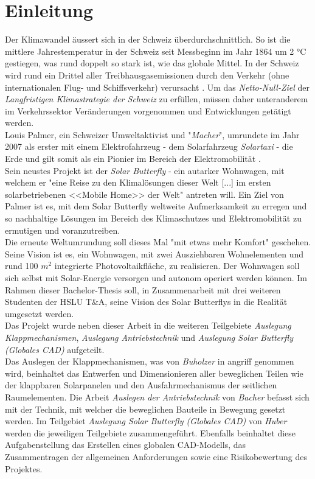 \section{Einleitung}
Der Klimawandel äussert sich in der Schweiz überdurchschnittlich. So ist die mittlere Jahrestemperatur in der Schweiz seit Messbeginn im Jahr 1864 um 2 °C gestiegen, was rund doppelt so stark ist, wie das globale Mittel. In der Schweiz wird rund ein Drittel aller Treibhausgasemissionen durch den Verkehr (ohne internationalen Flug- und Schiffsverkehr) verursacht \cite{BAFU}. Um das \emph{Netto-Null-Ziel} der \emph{Langfristigen Klimastrategie der Schweiz} zu erfüllen, müssen daher unteranderem im Verkehrssektor Veränderungen vorgenommen und Entwicklungen getätigt werden.\\
Louis Palmer, ein Schweizer Umweltaktivist und "\emph{Macher}", umrundete im Jahr 2007 als erster mit einem Elektrofahrzeug - dem Solarfahrzeug \emph{Solartaxi} - die Erde und gilt somit als ein Pionier im Bereich der Elektromobilität \cite{Palmer}.\\
Sein neustes Projekt ist der \emph{Solar Butterfly} - ein autarker Wohnwagen, mit welchem er "eine Reise zu den Klimalösungen dieser Welt [...] im ersten solarbetriebenen <<Mobile Home>> der Welt" antreten will. Ein Ziel von Palmer ist es, mit dem Solar Butterfly weltweite Aufmerksamkeit zu erregen und so nachhaltige Lösungen im Bereich des Klimaschutzes und Elektromobilität zu ermutigen und voranzutreiben.\\
Die erneute Weltumrundung soll dieses Mal "mit etwas mehr Komfort" geschehen. Seine Vision ist es, ein Wohnwagen, mit zwei Ausziehbaren Wohnelementen und rund 100 $m^2$ integrierte Photovoltaikfläche, zu realisieren. Der Wohnwagen soll sich selbst mit Solar-Energie versorgen und autonom operiert werden können. Im Rahmen dieser Bachelor-Thesis soll, in Zusammenarbeit mit drei weiteren Studenten der HSLU T\&A, seine Vision des Solar Butterflys in die Realität umgesetzt werden.\\
Das Projekt wurde neben dieser Arbeit in die weiteren Teilgebiete \emph{Auslegung Klappmechanismen}, \emph{Auslegung Antriebstechnik} und \emph{Auslegung Solar Butterfly (Globales CAD)} aufgeteilt.\\
Das Auslegen der Klappmechanismen, was von \emph{Buholzer} in angriff genommen wird, beinhaltet das Entwerfen und Dimensionieren aller beweglichen Teilen wie der klappbaren Solarpanelen und den Ausfahrmechanismus der seitlichen Raumelementen. Die Arbeit \emph{Auslegen der Antriebstechnik} von \emph{Bacher} befasst sich mit der Technik, mit welcher die beweglichen Bauteile in Bewegung gesetzt werden. Im Teilgebiet \emph{Auslegung Solar Butterfly (Globales CAD)} von \emph{Huber} werden die jeweiligen Teilgebiete zusammengeführt. Ebenfalls beinhaltet diese Aufgabenstellung das Erstellen eines globalen CAD-Modells, das Zusammentragen der allgemeinen Anforderungen sowie eine Risikobewertung des Projektes.

